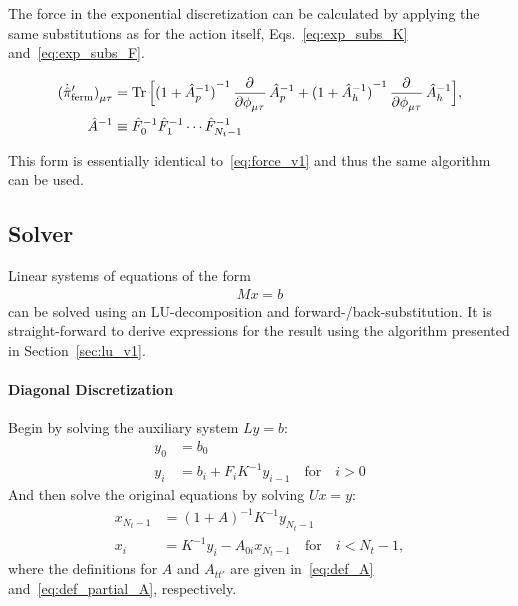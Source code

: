 \documentclass[a4paper, fleqn, twoside, notitlepage]{scrartcl}
\begin{document}
\noindent
The force in the exponential discretization can be calculated by applying the same substitutions as for the action itself, Eqs.~\eqref{eq:exp_subs_K} and~\eqref{eq:exp_subs_F}.
\begin{resultbox}
  \vspace{-\baselineskip}
  \begin{align}
    {(\dot{\hat{\pi}}'_{\text{ferm}})}_{\mu\tau} &= \Tr \Big[{(1+\hat{A}_p^{-1})}^{-1}\dpd{}{\phi_{\mu\tau}}\hat{A}_p^{-1} + {(1+\hat{A}_h^{-1})}^{-1}\dpd{}{\phi_{\mu\tau}}\hat{A}_h^{-1}\Big],\\
    \hat{A}^{-1} &\equiv \hat{F}_0^{-1} \hat{F}_1^{-1} \cdots \hat{F}_{N_t-1}^{-1}
  \end{align}
\end{resultbox}
\noindent
This form is essentially identical to~\eqref{eq:force_v1} and thus the same algorithm can be used.


\subsection{Solver}\label{sec:solver_v1}

Linear systems of equations of the form
\begin{align}
  M x = b\label{eq:linear_system_v1}
\end{align}
can be solved using an LU-decomposition and forward-/back-substitution.
It is straight-forward to derive expressions for the result using the algorithm presented in Section~\ref{sec:lu_v1}.

\paragraph{Diagonal Discretization}
Begin by solving the auxiliary system $L y = b$:
\begin{align}
  y_0 &= b_0\label{eq:y0_v1}\\
  y_i &= b_i + F_i K^{-1}y_{i-1} \quad \text{for} \quad i > 0\label{eq:recursion_y_v1}
\end{align}
And then solve the original equations by solving $U x = y$:
\begin{align}
  x_{N_t-1} &= {(1+A)}^{-1} K^{-1} y_{N_t-1}\\
  x_i &= K^{-1} y_i - A_{0i}x_{N_t-1} \quad \text{for} \quad i < N_t-1,
\end{align}
where the definitions for $A$ and $A_{tt'}$ are given in~\eqref{eq:def_A} and~\eqref{eq:def_partial_A}, respectively.
\end{document}
